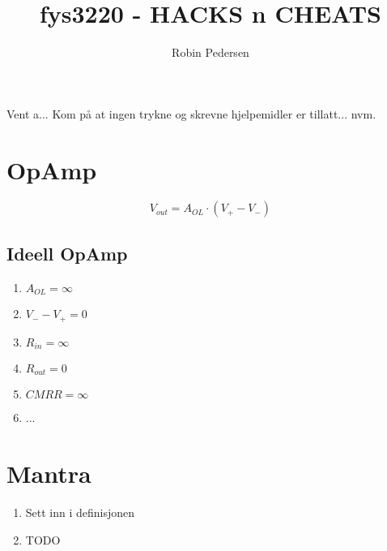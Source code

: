 \documentclass[twocolumn]{article}
\begin{document}
  \title{fys3220 - HACKS n CHEATS}
  \author{Robin Pedersen}
  \maketitle

  Vent a... Kom på at ingen trykne og skrevne hjelpemidler er tillatt... nvm.

  \section{OpAmp}
    $$V_{out} = A_{OL} \cdot (V_+ - V_-)$$

    \subsection{Ideell OpAmp}
      \begin{enumerate}
        \item $A_{OL} = \infty$
        \item $V_- - V_+ = 0$
        \item $R_{in} = \infty$
        \item $R_{out} = 0$
        \item $CMRR = \infty$
        \item ...
      \end{enumerate}

  \section{Mantra}
    \begin{enumerate}
      \item Sett inn i definisjonen
      \item TODO
    \end{enumerate}
\end{document}
